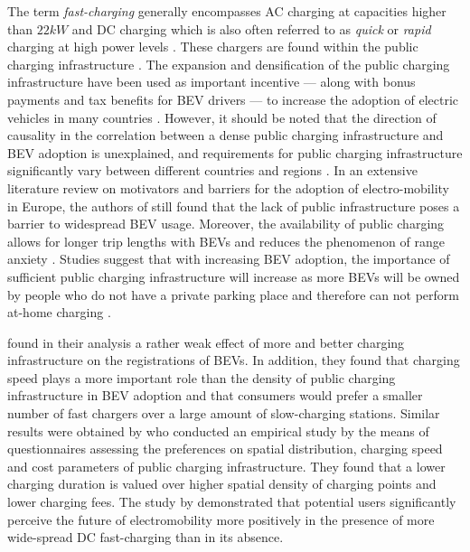 \documentclass[journal,article,submit,pdftex,moreauthors]{Definitions/mdpi}
\begin{document}
    The term \textit{fast-charging} generally encompasses AC charging at capacities higher than $22kW$ and DC charging which is also often referred to as \textit{quick} or \textit{rapid} charging at high power levels \citep[][]{Falvo2014}. These chargers are found within the public charging infrastructure \citep{Kotzur2021}. The expansion and densification of the public charging infrastructure have been used as important incentive --- along with bonus payments and tax benefits for BEV drivers --- to increase the adoption of electric vehicles in many countries  \citep{Parliament2018, Schulz2022}. However, it should be noted that the direction of causality in the correlation between a dense public charging infrastructure and BEV adoption is unexplained, and requirements for public charging infrastructure significantly vary between different countries and regions \citep{Arpad2019,Coffman2017, Parliament2018, Illmann2020}. In an extensive literature review on motivators and barriers for the adoption of electro-mobility in Europe, the authors of \citep{Efe2018} still found that the lack of public infrastructure poses a barrier to widespread BEV usage. Moreover, the availability of public charging allows for longer trip lengths with BEVs and reduces the phenomenon of range anxiety \citep{NEUBAUER201412, Neaimeh2017}. Studies suggest that with increasing BEV adoption, the importance of sufficient public charging infrastructure will increase as more BEVs will be owned by people who do not have a private parking place and therefore can not perform at-home charging \citep{Arpad2019, Engel2018}.
    
     \citet{Illmann2020} found in their analysis a rather weak effect of more and better charging infrastructure on the registrations of BEVs. In addition, they found that charging speed plays a more important role than the density of public charging infrastructure in BEV adoption and that consumers would prefer a smaller number of fast chargers over a large amount of slow-charging stations. Similar results were obtained by \citet{Globisch2019} who  conducted an empirical study by the means of questionnaires assessing the preferences on spatial distribution, charging speed and cost parameters of public charging infrastructure. They found that a lower charging duration is valued over higher spatial density of charging points and lower charging fees. The study by \citet{Gebauer2016} demonstrated that potential users significantly perceive the future of electromobility more positively in the presence of more wide-spread DC fast-charging than in its absence.
\end{document}
